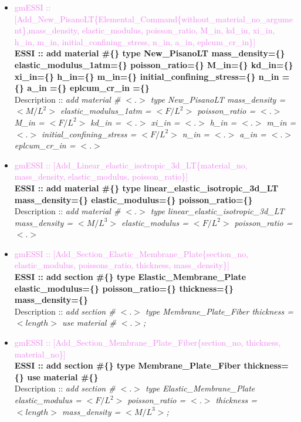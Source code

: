\documentclass[11pt]{article}
\begin{document}
\begin{itemize}
      \item \textcolor{violet}{gmESSI :: [Add\_New\_PisanoLT\{Elemental\_Command\{without\_material\_no\_argument\},mass\_density, elastic\_modulus, poisson\_ratio, M\_in, kd\_in, xi\_in, h\_in, m\_in, initial\_confining\_stress, n\_in, a\_in, eplcum\_cr\_in\}]}\\
      \textbf{ESSI :: add material \#\{\} type New\_PisanoLT mass\_density=\{\} elastic\_modulus\_1atm=\{\} poisson\_ratio=\{\} M\_in=\{\} kd\_in=\{\} xi\_in=\{\} h\_in=\{\} m\_in=\{\} initial\_confining\_stress=\{\} n\_in =\{\} a\_in =\{\} eplcum\_cr\_in =\{\}}\\
      Description ::  \textit{ add material \# $<.>$ type New\_PisanoLT  mass\_density = $<M/L^2>$ elastic\_modulus\_1atm = $<F/L^2>$ poisson\_ratio = $<.>$ M\_in = $<F/L^2>$ kd\_in = $<.>$ xi\_in = $<.>$ h\_in = $<.>$ m\_in = $<.>$ initial\_confining\_stress = $<F/L^2>$ n\_in = $<.>$ a\_in = $<.>$ eplcum\_cr\_in = $<.>$} 

      \item \textcolor{violet}{gmESSI :: [Add\_Linear\_elastic\_isotropic\_3d\_LT\{material\_no, mass\_density, elastic\_modulus, poisson\_ratio\}]}\\
      \textbf{ESSI :: add material \#\{\} type linear\_elastic\_isotropic\_3d\_LT mass\_density=\{\} elastic\_modulus=\{\} poisson\_ratio=\{\} }\\
      Description ::  \textit{ add material \# $<.>$ type linear\_elastic\_isotropic\_3d\_LT mass\_density = $<M/L^3>$ elastic\_modulus = $<F/L^2>$ poisson\_ratio = $<.>$} 

      \item \textcolor{violet} {gmESSI :: [Add\_Section\_Elastic\_Membrane\_Plate\{section\_no, elastic\_modulus, poissons\_ratio, thickness, mass\_density\}]}\\  
      \textbf{ESSI :: add section \#\{\} type Elastic\_Membrane\_Plate  elastic\_modulus=\{\}  poisson\_ratio=\{\}  thickness=\{\}  mass\_density=\{\}}\\
      Description :: \textit{add section \# $<.>$ type Membrane\_Plate\_Fiber thickness = $<length>$ use material \# $<.>$;}

      \item \textcolor{violet} {gmESSI :: [Add\_Section\_Membrane\_Plate\_Fiber\{section\_no, thickness, material\_no\}]}\\  
      \textbf{ESSI :: add section \#\{\} type Membrane\_Plate\_Fiber thickness=\{\}  use material \#\{\}}\\
      Description :: \textit{add section \# $<.>$ type Elastic\_Membrane\_Plate elastic\_modulus = $<F/L^2>$ poisson\_ratio = $<.>$ thickness = $<length>$ mass\_density = $<M/L^3>$;}

  \end{itemize}
\end{document}
